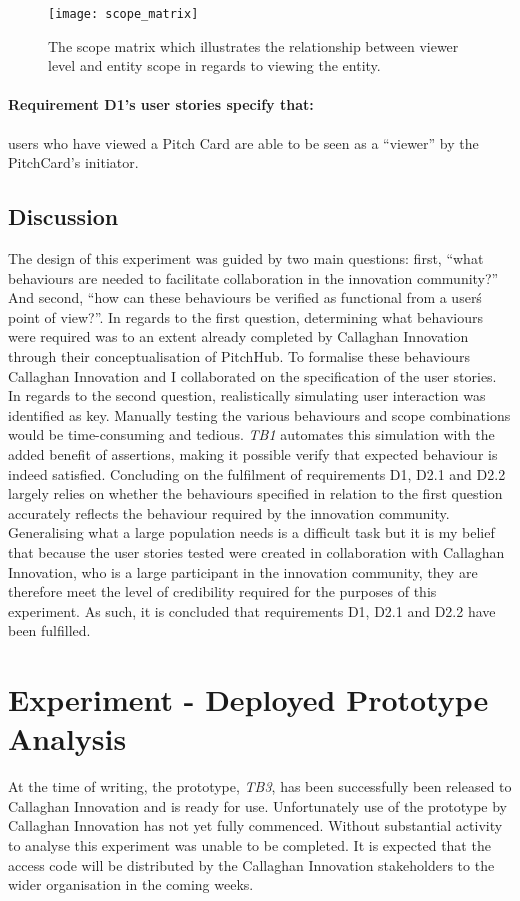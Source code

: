 \begin{figure}[ht]
    \centering
    \texttt{[image: scope\_matrix]}
    \caption{The scope matrix which illustrates the relationship between viewer level and entity scope in regards to viewing the entity.}
    \label{fig:architecturescope_matrix_evaluation}
\end{figure}

\paragraph{Requirement D1's user stories specify that:} users who have viewed a Pitch Card are able to be seen as a ``viewer'' by the PitchCard's initiator.

\subsection{Discussion}
The design of this experiment was guided by two main questions: first, ``what behaviours are needed to facilitate collaboration in the innovation community?'' And second, ``how can these behaviours be verified as functional from a user\'s point of view?''. In regards to the first question, determining what behaviours were required was to an extent already completed by Callaghan Innovation through their conceptualisation of PitchHub. To formalise these behaviours Callaghan Innovation and I collaborated on the specification of the user stories.
In regards to the second question, realistically simulating user interaction was identified as key. Manually testing the various behaviours and scope combinations would be time-consuming and tedious. \textit{TB1} automates this simulation with the added benefit of assertions, making it possible verify that expected behaviour is indeed satisfied.
Concluding on the fulfilment of requirements D1, D2.1 and D2.2 largely relies on whether the behaviours specified in relation to the first question accurately reflects the behaviour required by the innovation community. Generalising what a large population needs is a difficult task but it is my belief that because the user stories tested were created in collaboration with Callaghan Innovation, who is a large participant in the innovation community, they are therefore meet the level of credibility required for the purposes of this experiment. As such, it is concluded that requirements D1, D2.1 and D2.2 have been fulfilled.

\section{Experiment  - Deployed Prototype Analysis}
At the time of writing, the prototype, \textit{TB3}, has been successfully been released to Callaghan Innovation and is ready for use. Unfortunately use of the prototype by Callaghan Innovation has not yet fully commenced. Without substantial activity to analyse this experiment was unable to be completed. It is expected that the access code will be distributed by the Callaghan Innovation stakeholders to the wider organisation in the coming weeks.

